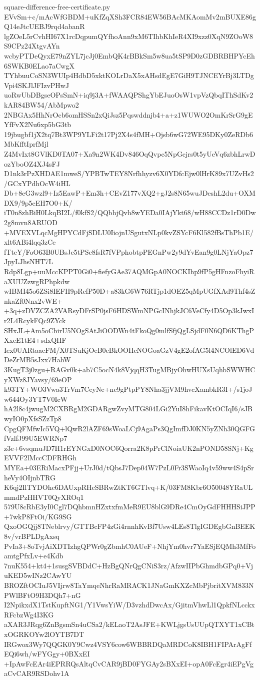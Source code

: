 \documentclass[11pt]{article}
\theoremstyle{definition}
\theoremstyle{remark}
\begin{document}
\begin{filecontents*}[overwrite]{square-difference-free-certificate.py}
EVvSm+c/mAcWfGBDM+uKfZqXSh3FCR84EW56BAcMKAomMv2mBUXE86gQ14eJtcUEBJ9rqd4abanR
lgZOeL5rCvhHI67X1rcDqpumQYfhoAnn9xM6TIhbKhIeR4XI9xzz0XqN9ZOoW8S9CPz24XtgvAYn
wcbyPTDeQyxE79nZYL7jcJj0EmbQK4rBBkSm5w8ua5tSP9D0zGDBRBHPYcEh6SWKB0ELao7aCwgX
TYhbuuCoSN3WUIp4HdbD5xktKOLrDaX5xAHsdEgE7GiH9TJNCEYrBj3LTDgVpi4SKJlJFIzvPHwJ
uoRwUbDBgseOPsSmN+iq9j3A+fWAAQPShgYbEJuoOsW1vpVzQbqIThSdKv2kAR84BW54/AbMpwo2
2NBGAx5HhNrOcb6omHSSn2xQiJsz5Pqswddnjb4+a+z1WUWO2OmKrSrG9gEYfFvX2Nu6xp5bG3tb
19jbugbf1jX2tq7Bt3WP9YLFi2t17Pj2X4s4fMH+Ojsb6wG72WE95DKy0ZeRDb6MbKfftIprfMjl
Z4MvIxt8GVlKD0TA07+Xa9n2WK4Dv846OqQvpc5NpGcjrs0t5yUeVq6zbhLrwDozYboOZ4XJ4sFJ
D1nk3rPzXHDAE1mweS/YPBTwTEY8Nrfhhyzv6X0YDfcEjw0lHrK89x7UZvHs2/GCxYPdhOcW4iHL
Db+8eG3wzl9+Iz5EawP+Em3h+CEvZ177vXQ2+gJ2s8N65wuJDeshL2du+OXMDX9/9p5eEH7O0+K/
iT0n8zhBiH0LkqBI2L/f0kfS2/QQbhjQvh8wYEDa0IAjYkt68/wH88CCDz1rD0Dw2g8mvn8ARUOD
+MVEXVLqcMgHPYCdFjSDLU0IiojnUSgutxNLp0kvZSYcF6Kl582fBsThPb1E/xlt6ABi4lqq3zCe
fTteY/FoO63B0UBsJe5tPSc8fsR7fVPphobtpPEGnPw2y9dYvEan9g0LNjYaOpz7JpyLJhsNHT7L
Rdp8Lgp+uuMccKPPT0Gi0+fiefyGAe37AQMGpA0NOCKIhp9fP5gHFnzoFhyiRaXUUZzwgRPhpkdw
wIBMI45o6ZSi8IEFH9pRcfP50D+a83kG6W76RTjp1dOEZ5qMpUGfXAd9Thf4sZnkaZf0Nnx2vWE+
+3q+zDVZCZA2VARsyDFrSP0jsF6HDSWmNPGcINhjkJC6VeCfy4D5Op3kJwxIr2L4RcykFQc9ZYck
SHxJL+Am5oCbirU5NOgSAtJiOODWn4tFkoQg0mlfSfjQgLSjdF0N6QD6KThgPXxeE1tE4+sdxQHF
Iex0UARtaacFM/X0TSuKjOeB0eBkOOHcNOGoaGzV4gE2ofAG5l4NCOlED6VdDeZrMB5sJxx7HahW
3KugT3j0zgu+RAGv0k+ab7C5ocN4k8VjqqH3TugMBjyOhwHUXsUqhbSWWHCyXWz8JYavsy/69eOP
k93TY+WO3Vwa3TrVm7CeyNe+nc9gPtpPY8Nha3jjVM9hvcXambkR3I+/s1joJw644Oy3YT7V0IcW
hA2l8c4jwugM2CXBRgM2GDARgwZvyMTG804LGi2YuI8hFikavKtOCIqI6/sJBwyIO0pXfsSZzTp8
CpgQFMfwIc5VQ+lQwR2lAZF69sWoaLCj9AgaPs3QgImfDJ0KN5yZNh30QGFGfVzlfJ99U5EWRNp7
z3e+6vsqmuJD7H1rEYNGxD0NOC6Qorra2K8pPrClNoiaUK2nPOND58SNj+KgEVVF2lMccCDFRHGh
MYEa+03ERiMacxPFjj+UrJ0d/tQbsJ7Dep04W7PzL0Fr3SWaoIq4v59ww4S4pSrheVy4OIjnbTRG
K6qj2IlTYDOhc6DAUxpRHcSBRwZtKT6GTlvq+K/03FM8Kbr6O50048YRaULmmdPzHHVT0QyXROq1
579U8cRbE3yI0Cgl7DQhbmnHZxtxfmMeR9EU8blG9DRe4CmOyGdFHHHSiJPP+7wkP8FtOi/KG9SG
QxoOGQjj8TNeblrvy/GTTBcFP4zGi4rnnhKvBf7Usw4LEs8TlgIGDEgbGnBEEK8v/vrBPLDgAxsq
PvIa3+8oTvjAiXDTIzhgQPWr0gZbmhC0AUeF+NhjYm0hvr7YaESjEQMh3MfFoamtgPfxLv+e4Kdb
7nuK554+kt4+1susgSVBDdC+HzBgQNrQgCNiS3rz/AfzwIIPbGhmdbGPq0+VjuKED5wINz2CAwYU
BROZftOCIuJ5VIjrw8TaYmqeNhrRaMRACK1JNaGmKXZcMbPjbritXVM833NPWlBFtO9H3DQh7+nG
I2NpikxdX1TstKupftNG1/Y1VwsYiW/D3vzhdDwcAx/GjitmVhwLl1QpkfNLcckxRFcbzWg4I3KG
aXAR3JRqg6ZnBgsmSn4uCSa2/kELaoT2AsJFE+KWLjgsUsUUpQTXYT1xCBtxOGRKOYw2lOYTB7DT
IRGwox3Wy7QQGK0Y9Cwz4VSY6cow6WBBRDQaMRDCoK8IBH1FIPArAgFfEQi6wh/wFYGgy+0BXxEI
+IpAwFcEAr4iEPRRQsAltqCvCAR9jBD0FYGAy2sBXxEI+opA0FcEgr4iEPgVgaCvCAR9RSDohv1A

\end{filecontents*}
\end{document}
